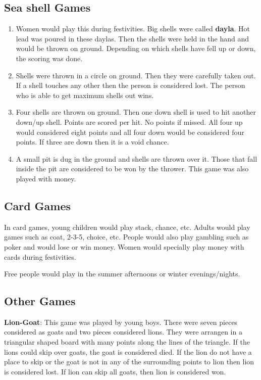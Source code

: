 \subsection{Sea shell Games} \begin{enumerate}

\item Women would play this during festivities. Big shells were called
\textbf{dayla}. Hot lead was poured in these daylas. Then the shells were held
in the hand and would be thrown on ground. Depending on which shells have fell
up or down, the scoring was done.

\item Shells were thrown in a circle on ground. Then they were carefully taken
out. If a shell touches any other then the person is considered lost. The
person who is able to get maximum shells out wins.

\item Four shells are thrown on ground. Then one down shell is used to hit
another down/up shell. Points are scored per hit. No points if missed. All four
up would considered eight points and all four down would be considered four
points. If three are down then it is a void chance.

\item A small pit is dug in the ground and shells are thrown over it. Those
that fall inside the pit are considered to be won by the thrower. This game was
also played with money.

\end{enumerate}

\subsection{Card Games}
In card games, young children would play stack, chance, etc. Adults would play
games such as coat, 2-3-5, choice, etc. People would also play gambling such as
poker and would lose or win money. Women would specially play money with cards
during festivities. 

Free people would play in the summer afternoons or winter evenings/nights.

\subsection{Other Games}

\textbf{Lion-Goat}: This game was played by young boys. There were seven pieces
considered as goats and two pieces considered lions. They were arrangen in a
triangular shaped board with many points along the lines of the triangle. If
the lions could skip over goats, the goat is considered died. If the lion do
not have a place to skip or the goat is not in any of the surrounding points to
lion then lion is considered lost. If lion can skip all goats, then lion is
considered won. 

